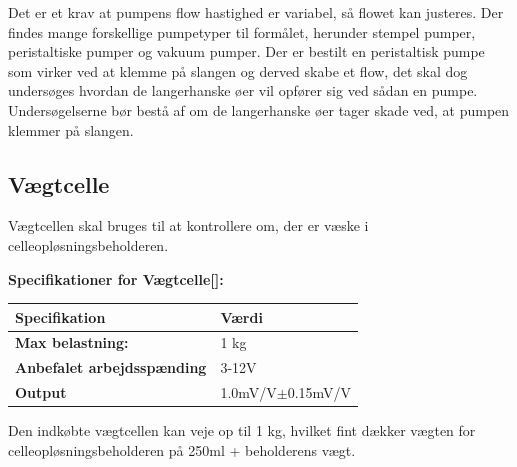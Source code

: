 Det er et krav at pumpens flow hastighed er variabel, så flowet kan justeres. Der findes mange forskellige pumpetyper til formålet, herunder stempel pumper, peristaltiske pumper og vakuum pumper. Der er bestilt en peristaltisk pumpe som virker ved at klemme på slangen og derved skabe et flow, det skal dog undersøges hvordan de langerhanske øer vil opfører sig ved sådan en pumpe. Undersøgelserne bør bestå af om de langerhanske øer tager skade ved, at pumpen klemmer på slangen. 

\subsection{Vægtcelle}
\label{subsec:loadcell}
Vægtcellen skal bruges til at kontrollere om, der er væske i celleopløsningsbeholderen.

\textbf{Specifikationer for Vægtcelle[\citet{DH7}]:} 
\begin{center}
		\begin{longtable}{ | m{6.5cm} | m{6.5cm}| } 
			\hline
			\textbf{Specifikation} &\textbf{Værdi} \\ 
			\hline
			\textbf{Max belastning:} & 1 kg \\ 
			\hline
			\textbf{Anbefalet arbejdsspænding} & 3-12V \\ 
			\hline
			\textbf{Output} & 1.0mV/V$\pm$0.15mV/V \\ 
			\hline
		\end{longtable}
\end{center}

Den indkøbte vægtcellen kan veje op til 1 kg, hvilket fint dækker vægten for celleopløsningsbeholderen på 250ml + beholderens vægt.



\newpage
